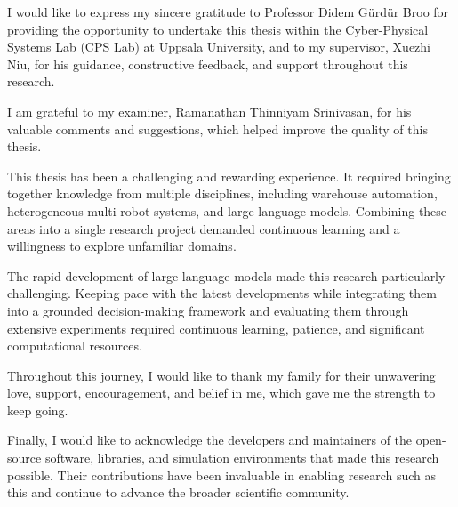 I would like to express my sincere gratitude to Professor Didem Gürdür Broo for providing the opportunity to undertake this thesis within the Cyber-Physical Systems Lab (CPS Lab) at Uppsala University, and to my supervisor, Xuezhi Niu, for his guidance, constructive feedback, and support throughout this research.

I am grateful to my examiner, Ramanathan Thinniyam Srinivasan, for his valuable comments and suggestions, which helped improve the quality of this thesis.

This thesis has been a challenging and rewarding experience. It required bringing together knowledge from multiple disciplines, including warehouse automation, heterogeneous multi-robot systems, and large language models. Combining these areas into a single research project demanded continuous learning and a willingness to explore unfamiliar domains.

The rapid development of large language models made this research particularly challenging. Keeping pace with the latest developments while integrating them into a grounded decision-making framework and evaluating them through extensive experiments required continuous learning, patience, and significant computational resources.

Throughout this journey, I would like to thank my family for their unwavering love, support, encouragement, and belief in me, which gave me the strength to keep going.

Finally, I would like to acknowledge the developers and maintainers of the open-source software, libraries, and simulation environments that made this research possible. Their contributions have been invaluable in enabling research such as this and continue to advance the broader scientific community.
